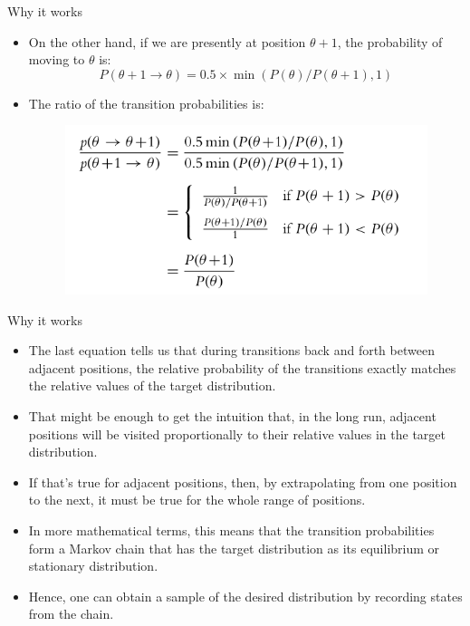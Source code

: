\documentclass[handout]{beamer}
\begin{document}
\begin{frame}{Why it works}
\scriptsize{

\begin{itemize}
\item On the other hand, if we are presently at position $\theta+ 1$, the probability of moving to $\theta$ is:
\begin{displaymath}
P(\theta+1 \rightarrow \theta) = 0.5 \times \min(P(\theta)/P(\theta+1),1) 
\end{displaymath}

\item The ratio of the transition probabilities is:

  \begin{figure}[h!]
	\centering
	\includegraphics[scale=0.4]{pics/trans_ratio.png}
	\end{figure} 

\end{itemize}


} 
\end{frame}


\begin{frame}{Why it works}
\scriptsize{

\begin{itemize}
\item The last equation tells us that during transitions back and forth between adjacent positions, the relative probability of the transitions exactly matches the relative values of the target distribution. 
\item That might be enough to get the intuition that, in the
long run, adjacent positions will be visited proportionally to their relative values in the target distribution. 
\item If that's true for adjacent positions, then, by extrapolating from one position to the next, it must be true for the whole range of positions.

\item In more mathematical terms, this means that the transition probabilities form a Markov chain that has the target distribution as its equilibrium or stationary distribution. \cite{wiki:Markov_chain_Monte_Carlo}

\item Hence, one can obtain a sample of the desired distribution by recording states from the chain.


\end{itemize}


} 
\end{frame}
\end{document}

